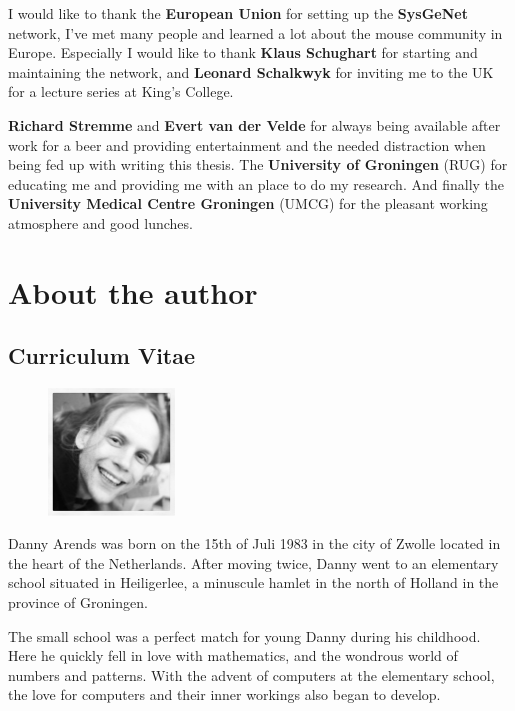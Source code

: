 I would like to thank the {\bf European Union} for setting up the {\bf SysGeNet} network, I've met 
many people and learned a lot about the mouse community in Europe. Especially I would like to thank 
{\bf Klaus Schughart} for starting and maintaining the network, and {\bf Leonard Schalkwyk} for 
inviting me to the UK for a lecture series at King's College.

{\bf Richard Stremme} and {\bf Evert van der Velde} for always being available after work for a beer and providing
entertainment and the needed distraction when being fed up with writing this thesis.
The {\bf University of Groningen} (RUG) for educating me and providing me with an place to do my research. And 
finally the {\bf University Medical Centre Groningen} (UMCG) for the pleasant working atmosphere and good lunches.

\newpage

\section{About the author}
\subsection{Curriculum Vitae}

\begin{figure}
  \centering
  \includegraphics[width=0.3\textwidth]{eps/image_6_1.eps}
\end{figure}

Danny Arends was born on the 15th of Juli 1983 in the city of Zwolle located in the heart 
of the Netherlands. After moving twice, Danny went to an elementary school situated in 
Heiligerlee, a minuscule hamlet in the north of Holland in the province of Groningen. 

The small school was a perfect match for young Danny during his childhood. Here he quickly 
fell in love with mathematics, and the wondrous world of numbers and patterns. With the 
advent of computers at the elementary school, the love for computers and their inner 
workings also began to develop.

